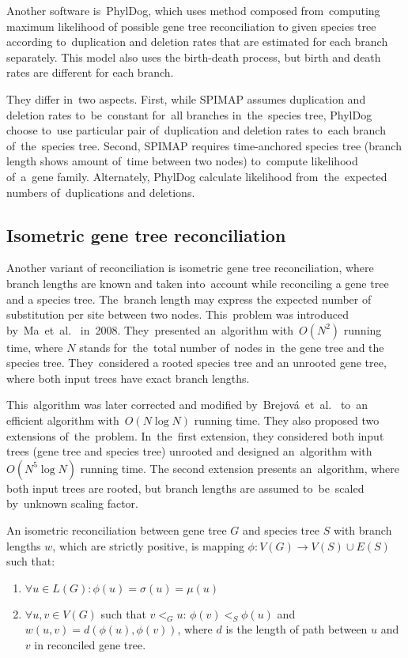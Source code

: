 Another software is~PhylDog\cite{phyldog}, which uses method composed from~computing maximum likelihood of possible gene tree reconciliation to given species tree according to~duplication and deletion rates that are estimated for each branch separately. This model also uses the birth-death process, but birth and death rates are different for each branch.

They differ in~two aspects. First, while SPIMAP assumes duplication and deletion rates to~be~constant for~all branches in~the~species tree, PhylDog choose to~use particular pair of~duplication and deletion rates to~each branch of~the~species tree. Second, SPIMAP requires time-anchored species tree (branch length shows amount of~time between two nodes) to~compute likelihood of~a~gene family. Alternately, PhylDog calculate likelihood from~the~expected numbers of~duplications and deletions. 


\subsection{Isometric gene tree reconciliation}
Another variant of reconciliation is isometric gene tree reconciliation, where branch lengths are known and taken into~account while reconciling a gene tree and a species tree. The~branch length may express the expected number of substitution per site between two nodes. This~problem was introduced by~Ma~et~al.~\cite{ma} in~2008. They~presented an~algorithm with~$O(N^2)$ running time, where $N$ stands for~the~total number of~nodes in~the gene tree and the species tree. They~considered a rooted species tree and an unrooted gene tree, where both input trees have exact branch lengths.

This~algorithm was later corrected and modified by~Brejová~et~al.~\cite{brejova} to~an efficient algorithm with~$O(N \log N)$ running time. They also proposed two extensions of~the~problem. In~the~first extension, they considered both input trees (gene tree and species tree) unrooted and designed an~algorithm with~$O(N^5 \log N)$ running time. The second extension presents an~algorithm, where both input trees are rooted, but branch lengths are assumed to~be~scaled by~unknown scaling factor.

\begin{definition}
An isometric reconciliation between gene tree $G$ and species tree $S$ with branch lengths $w$, which are strictly positive, is mapping $\phi: V(G) \rightarrow V(S) \cup E(S)$ such that:
	\begin{enumerate}\itemsep0em
	\item $\forall u \in L(G): \phi(u) = \sigma(u) = \mu(u)$
	\item $\forall u, v \in V(G)$ such that $v<_Gu$: $\phi(v)<_S\phi(u)$ and $w(u, v) = d(\phi(u), \phi(v))$, where $d$ is the length of path between $u$ and $v$ in reconciled gene tree.
	\end{enumerate}
\end{definition}

